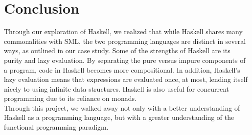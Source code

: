 \documentclass[journal]{IEEEtran}
\begin{document}
\section{Conclusion}
Through our exploration of Haskell, we realized that while Haskell shares many commonalities with SML, the two programming languages are distinct in several ways, as outlined in our case study. Some of the strengths of Haskell are its purity and lazy evaluation. By separating the pure versus impure components of a program, code in Haskell becomes more compositional. In addition, Haskell's lazy evaluation means that expressions are evaluated once, at most, lending itself nicely to using infinite data structures. Haskell is also useful for concurrent programming due to its reliance on monads. \\
Through this project, we walked away not only with a better understanding of Haskell as a programming language, but with a greater understanding of the functional programming paradigm. 



%
%

\end{document}
